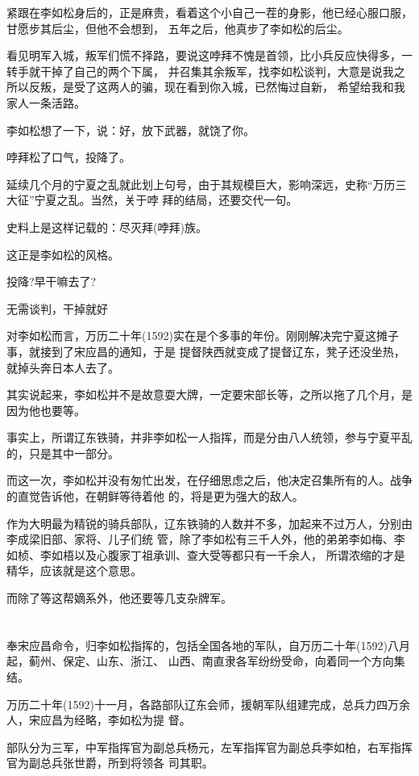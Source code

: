 \documentclass[11pt,a4paper,onecolumn]{article}
\begin{document}
紧跟在李如松身后的，正是麻贵，看着这个小自己一茬的身影，他已经心服口服，甘愿步其后尘，但他不会想到，
五年之后，他真步了李如松的后尘。

看见明军入城，叛军们慌不择路，要说这哱拜不愧是首领，比小兵反应快得多，一转手就干掉了自己的两个下属，
并召集其余叛军，找李如松谈判，大意是说我之所以反叛，是受了这两人的骗，现在看到你入城，已然悔过自新，
希望给我和我家人一条活路。

李如松想了一下，说：好，放下武器，就饶了你。

哱拜松了口气，投降了。

延续几个月的宁夏之乱就此划上句号，由于其规模巨大，影响深远，史称``万历三大征''宁夏之乱。当然，关于哱
拜的结局，还要交代一句。

史料上是这样记载的：尽灭拜(哱拜)族。

这正是李如松的风格。

投降?早干嘛去了?

无需谈判，干掉就好

对李如松而言，万历二十年(1592)实在是个多事的年份。刚刚解决完宁夏这摊子事，就接到了宋应昌的通知，于是
提督陕西就变成了提督辽东，凳子还没坐热，就掉头奔日本人去了。

其实说起来，李如松并不是故意耍大牌，一定要宋部长等，之所以拖了几个月，是因为他也要等。

事实上，所谓辽东铁骑，并非李如松一人指挥，而是分由八人统领，参与宁夏平乱的，只是其中一部分。

而这一次，李如松并没有匆忙出发，在仔细思虑之后，他决定召集所有的人。战争的直觉告诉他，在朝鲜等待着他
的，将是更为强大的敌人。

作为大明最为精锐的骑兵部队，辽东铁骑的人数并不多，加起来不过万人，分别由李成梁旧部、家将、儿子们统
管，除了李如松有三千人外，他的弟弟李如梅、李如桢、李如梧以及心腹家丁祖承训、查大受等都只有一千余人，
所谓浓缩的才是精华，应该就是这个意思。

而除了等这帮嫡系外，他还要等几支杂牌军。

\section[\thesection]{}

奉宋应昌命令，归李如松指挥的，包括全国各地的军队，自万历二十年(1592)八月起，蓟州、保定、山东、浙江、
山西、南直隶各军纷纷受命，向着同一个方向集结。

万历二十年(1592)十一月，各路部队辽东会师，援朝军队组建完成，总兵力四万余人，宋应昌为经略，李如松为提
督。

部队分为三军，中军指挥官为副总兵杨元，左军指挥官为副总兵李如柏，右军指挥官为副总兵张世爵，所到将领各
司其职。
\end{document}
